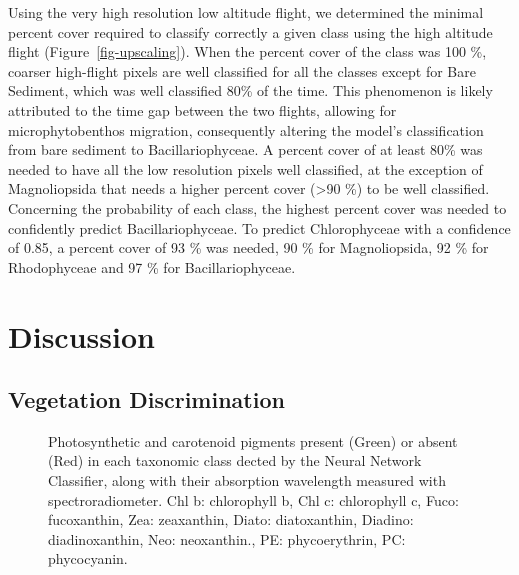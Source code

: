 \documentclass[
  number]{elsarticle}
\begin{document}
Using the very high resolution low altitude flight, we determined the
minimal percent cover required to classify correctly a given class using
the high altitude flight (Figure~\ref{fig-upscaling}). When the percent
cover of the class was 100 \%, coarser high-flight pixels are well
classified for all the classes except for Bare Sediment, which was well
classified 80\% of the time. This phenomenon is likely attributed to the
time gap between the two flights, allowing for microphytobenthos
migration, consequently altering the model's classification from bare
sediment to Bacillariophyceae. A percent cover of at least 80\% was
needed to have all the low resolution pixels well classified, at the
exception of Magnoliopsida that needs a higher percent cover
(\textgreater90 \%) to be well classified. Concerning the probability of
each class, the highest percent cover was needed to confidently predict
Bacillariophyceae. To predict Chlorophyceae with a confidence of 0.85, a
percent cover of 93 \% was needed, 90 \% for Magnoliopsida, 92 \% for
Rhodophyceae and 97 \% for Bacillariophyceae.

\section{Discussion}\label{discussion}

\subsection{Vegetation Discrimination}\label{vegetation-discrimination}

\label{cell-fig-Pigm}
\begin{figure}[H]


\caption{\label{fig-Pigm}Photosynthetic and carotenoid pigments present
(Green) or absent (Red) in each taxonomic class dected by the Neural
Network Classifier, along with their absorption wavelength measured with
spectroradiometer. Chl b: chlorophyll b, Chl c: chlorophyll c, Fuco:
fucoxanthin, Zea: zeaxanthin, Diato: diatoxanthin, Diadino:
diadinoxanthin, Neo: neoxanthin., PE: phycoerythrin, PC: phycocyanin.}

\end{figure}%
\end{document}

